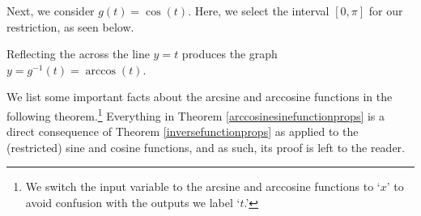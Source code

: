 \documentclass{ximera}
\begin{document}
\begin{center}
\end{center}

Next, we consider $g(t) = \cos(t)$.  Here, we select the interval $[0,\pi]$ for our restriction, as seen below.  

\begin{center}
\end{center} 

Reflecting the across the line $y = t$ produces  the graph $y = g^{-1}(t) = \arccos(t)$. 


\begin{center}
\end{center}

We list some important facts about the arcsine and arccosine functions in the following theorem.\footnote{We switch the input variable to the arcsine and arccosine functions to `$x$' to avoid confusion with the outputs we label `$t$.'}   Everything in Theorem \ref{arccosinesinefunctionprops} is a direct consequence of Theorem \ref{inversefunctionprops} as applied to the (restricted) sine and cosine functions, and as such, its proof is left to the reader.

 

\end{document}
